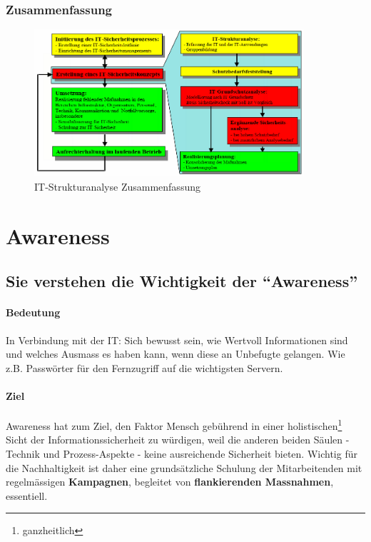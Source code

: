 \documentclass[10pt,a4paper]{article}
\begin{document}
\subsubsection*{Zusammenfassung}
\begin{figure}[H]
    \begin{center}
    \includegraphics[width=10cm]{images/zusammenfassung.png}
    \caption{IT-Strukturanalyse Zusammenfassung}
    \label{IT-Strukturanalyse Zusammenfassung}
    \end{center}
\end{figure}

\pagebreak
\section{Awareness}
\subsection*{Sie verstehen die Wichtigkeit der "`Awareness"'}
\paragraph*{Bedeutung}In Verbindung mit der IT: Sich bewusst sein, wie Wertvoll Informationen sind und welches Ausmass es haben kann, wenn diese an Unbefugte gelangen. Wie z.B. Passwörter für den Fernzugriff auf die wichtigsten Servern.

\paragraph*{Ziel}Awareness hat zum Ziel, den Faktor Mensch gebührend in einer holistischen\footnote{ganzheitlich} Sicht der Informationssicherheit zu würdigen, weil die anderen beiden Säulen - Technik und Prozess-Aspekte - keine ausreichende Sicherheit bieten. Wichtig für die Nachhaltigkeit ist daher eine grundsätzliche Schulung der Mitarbeitenden mit regelmässigen \textbf{Kampagnen}, begleitet von \textbf{flankierenden Massnahmen}, essentiell.
\end{document}
